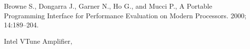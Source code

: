 \documentclass[times]{nlaauth}
\begin{document}
\begin{thebibliography}{99}
{Browne S., Dongarra J., Garner N., Ho G., and Mucci P.,}
\newblock A Portable Programming Interface for Performance Evaluation on Modern Processors.
 2000; 14:189--204.

{Intel VTune Amplifier,}


\end{thebibliography}
\end{document}
